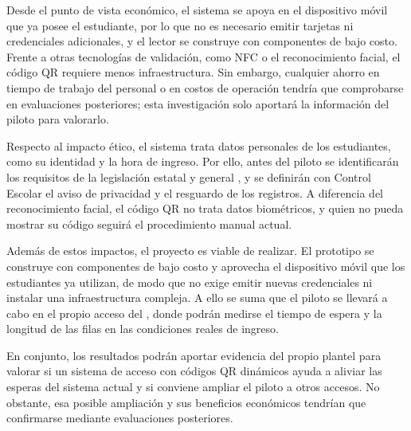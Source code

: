 Desde el punto de vista económico, el sistema se apoya en el dispositivo móvil que ya
posee el estudiante, por lo que no es necesario emitir tarjetas ni
credenciales adicionales, y el lector se construye con componentes de bajo
costo. Frente a otras tecnologías de validación, como NFC o el
reconocimiento facial, el código QR requiere menos infraestructura. Sin
embargo, cualquier ahorro en tiempo de trabajo del personal o en costos de
operación tendría que comprobarse en evaluaciones posteriores; esta
investigación solo aportará la información del piloto para valorarlo.

Respecto al impacto ético, el sistema trata datos personales de los
estudiantes, como su identidad y la hora de ingreso. Por ello, antes del
piloto se identificarán los requisitos de la legislación estatal
\parencite{edomex2017datos} y general \parencite{lgpdppso2025}, y se
definirán con Control Escolar el aviso de privacidad y el resguardo de los
registros. A diferencia del reconocimiento facial, el código QR no trata
datos biométricos, y quien no pueda mostrar su código seguirá el
procedimiento manual actual.

Además de estos impactos, el proyecto es viable de realizar. El prototipo se
construye con componentes de bajo costo y aprovecha el dispositivo móvil que los
estudiantes ya utilizan, de modo que no exige emitir nuevas credenciales ni
instalar una infraestructura compleja. A ello se suma que el piloto se
llevará a cabo en el propio acceso del \tescha{}, donde podrán medirse el
tiempo de espera y la longitud de las filas en las condiciones reales de
ingreso.

En conjunto, los resultados podrán aportar evidencia del propio plantel para
valorar si un sistema de acceso con códigos QR dinámicos ayuda a aliviar
las esperas del sistema actual y si conviene ampliar el piloto a otros
accesos. No obstante, esa posible ampliación y sus beneficios económicos
tendrían que confirmarse mediante evaluaciones posteriores.
